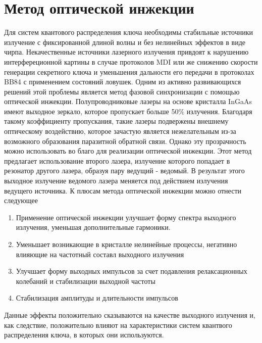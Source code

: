 \section{Метод оптической инжекции}\label{sec:ch2/sect1}
Для систем квантового распределения ключа необходимы стабильные источники излучение с фиксированной длиной волны и без нелинейных эффектов в виде чирпа. Некачественные источники лазерного излучения привдоят к нарушению интерфереционной картины в случае протоколов MDI или же снижению скорости генерации секретного ключа и уменьшения дальности его передачи в протоколах BB84 с применением состояний ловушек. Одним из активно развивающихся решений этой проблемы является метод фазовой синхронизации с помощью оптической инжекции. 
\newline Полупроводниковые лазеры  на основе кристалла InGaAs имеют выходное зеркало, которое пропускает больше 50\% излучения. Благодаря такому коэффициенту пропускания, такие лазеры подвержены внешнему оптическому воздействию, которое зачастую является нежелательным из-за возможного образования паразитной обратной связи. Однако эту прозрачность можно использовать во благо для реализации оптической инжекции. Этот метод предлагает использование второго лазера, излучение которого попадает в резонатор другого лазера, образуя пару ведущий - ведомый. В результат этого выходное излучение ведомого лазера меняется под действием излучения ведущего источника. К плюсам метода оптической инжекции можно отнести следующее
\begin{enumerate}
    \item Применение оптической инжекции улучшает форму спектра выходного излучения, уменьшая дополнительные гармоники.
    \item Уменьшает возникающие в кристалле нелинейные процессы, негативно влияющие на частотный составл выходного излучения
    \item Улучшает форму выходных импульсов за счет подавления релаксационных колебаний и стабилизации выходной частоты
    \item Стабилизация амплитуды и длительности импульсов
\end{enumerate}
Данные эффекты положительно сказываются на качестве выходного излучения и, как следствие, положительно влияют на характеристики систем квантвого распределения ключа, в которых они используются.
